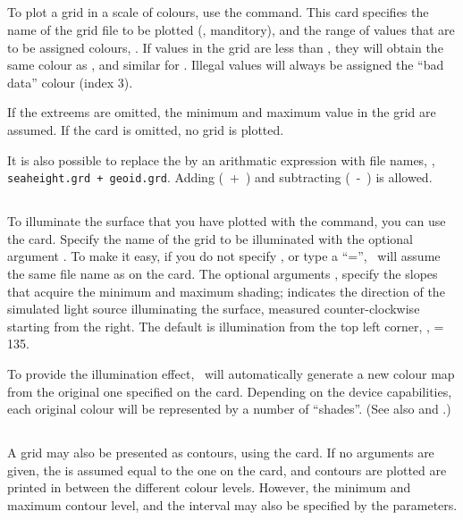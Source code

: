 \subsection{}
To plot a grid in a scale of colours, use the 
command. This card specifies the name of the grid file to be plotted
(, manditory), and the range of values that are to
be assigned colours, . If values in the grid are
less than , they will obtain the same colour as ,
and similar for .
Illegal values will always be assigned the ``bad data'' colour (index 3).

If the extreems are omitted, the minimum and
maximum value in the grid are assumed.
If the card is omitted, no grid is plotted.

It is also possible to replace the  by an arithmatic
expression with file names, \eg, {\tt seaheight.grd + geoid.grd}. Adding
(~+~) and subtracting (~-~) is allowed.

\subsection{}
To illuminate the surface that you have plotted with the 
command, you can use the  card. Specify the name of the grid
to be illuminated with the optional argument . To make it
easy, if you do not specify , or type a ``='', \PIM\ will
assume the same file name as on the  card. The optional
arguments , specify the slopes that acquire the minimum
and maximum shading;  indicates the direction of the
simulated light source illuminating the surface, measured counter-clockwise
starting from the right. The default is illumination from the top left
corner, \ie,  = 135.

To provide the illumination effect, \PIM\ will automatically generate a
new colour map from the original one specified on the 
card. Depending on the device capabilities, each original colour will be
represented by a number of ``shades''. (See also  and
.)

\subsection{}
A grid may also be presented as contours, using the 
card. If no arguments are given, the  is assumed equal
to the one on the  card, and contours are plotted are
printed in between the different colour levels. However, the minimum
and maximum contour level, and the interval may also be specified
by the  parameters.

